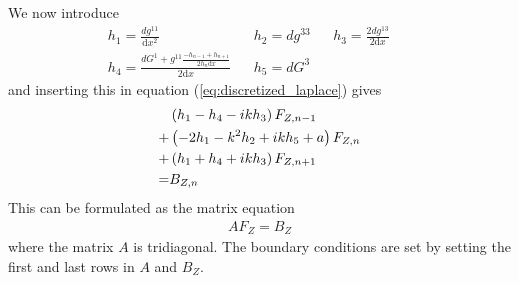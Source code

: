 %
We now introduce
%
\begin{align*}
    &h_1 = \frac{dg^{11}}{\text{d}x^2}& &h_2 = dg^{33}& &h_3 =
    \frac{2dg^{13}}{2\text{d}x}& && \\ &h_4 = \frac{dG^1 + g^{11}\frac{-h_{n-1}
    + h_{n+1}}{2h_n\text{d}x}}{2\text{d}x}& &h_5 = dG^3& &&
\end{align*}
%
and inserting this in equation (\ref{eq:discretized_laplace}) gives
%
\begin{align*}
    &\L( h_1 - h_4 -ikh_3 \R) F_{Z,n-1} \\
    +&\L( -2h_1 - k^2h_2 +ikh_5 + a \R) F_{Z,n} \\
    +&\L( h_1 + h_4 + ikh_3 \R) F_{Z, n+1} \\
%
     =& B_{Z,n}
\end{align*}
%
This can be formulated as the matrix equation
%
\begin{align*}
    AF_Z=B_Z
\end{align*}
%
where the matrix $A$ is tridiagonal. The boundary conditions are set by setting
the first and last rows in $A$ and $B_Z$.
